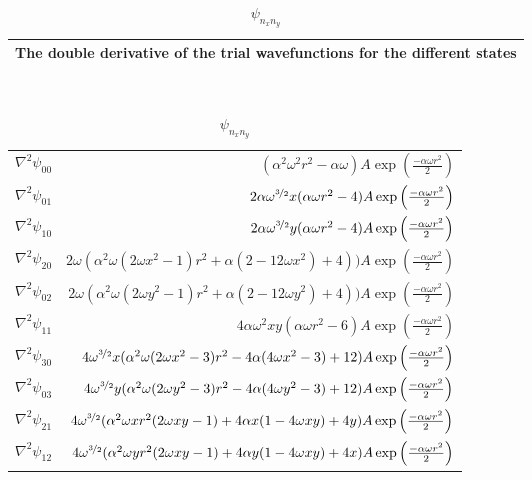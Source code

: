 \begin{table}[H]\caption{$\psi_{n_xn_y}$}\label{tab:doble_derivative_single_particle_trial_wavefunctions}
\begin{tabular}{l}
The double derivative of the trial wavefunctions for the different states\\ \hline
\end{tabular}\\
\begin{tabular}{l|r}
\large $\nabla^2 \psi_{00}$ & \large $ (\alpha^2\omega^2 r^2-\alpha\omega) A\exp\left({\frac{-\alpha\omega r^2}{2}}\right)$\\
\large $\nabla^2 \psi_{01}$ & \large $2\alpha \omega^{\nicefrac{3}{2}} x (\alpha \omega r^2 -4)A\exp\left({\frac{-\alpha\omega r^2}{2}}\right)$\\
\large $\nabla^2 \psi_{10}$ & \large $2\alpha \omega^{\nicefrac{3}{2}} y (\alpha \omega r^2 -4)A\exp\left({\frac{-\alpha\omega r^2}{2}}\right)$\\
\large $\nabla^2 \psi_{20}$ & \large $2\omega(\alpha^2 \omega (2\omega x^2 -1)r^2 + \alpha (2-12 \omega x^2) + 4)) A\exp\left({\frac{-\alpha\omega r^2}{2}}\right)$\\
\large $\nabla^2 \psi_{02}$ & \large $2\omega(\alpha^2 \omega (2\omega y^2 -1)r^2 + \alpha (2-12 \omega y^2) + 4)) A\exp\left({\frac{-\alpha\omega r^2}{2}}\right)$\\
\large $\nabla^2 \psi_{11}$ & \large $4\alpha \omega^2 xy(\alpha \omega r^2 - 6)A\exp\left({\frac{-\alpha\omega r^2}{2}}\right)$\\
\large $\nabla^2 \psi_{30}$ & \large $ 4 \omega^{\nicefrac{3}{2}} x (\alpha^2 \omega (2 \omega x^2 - 3) r^2 - 4 \alpha (4 \omega x^2 - 3) + 12) A\exp\left({\frac{-\alpha\omega r^2}{2}}\right)$\\
\large $\nabla^2 \psi_{03}$ & \large$ 4 \omega^{\nicefrac{3}{2}} y (\alpha^2 \omega (2 \omega y^2 - 3) r^2 - 4 \alpha (4 \omega y^2 - 3) + 12) A\exp\left({\frac{-\alpha\omega r^2}{2}}\right)$\\
\large $\nabla^2 \psi_{21}$ & \large $4 \omega^{\nicefrac{3}{2}} (\alpha^2 \omega x r^2 (2 \omega x y - 1) + 4 \alpha x (1 - 4\omega x y) + 4 y)A\exp\left({\frac{-\alpha\omega r^2}{2}}\right)$\\
\large $\nabla^2 \psi_{12}$ & \large $4 \omega^{\nicefrac{3}{2}} (\alpha^2 \omega y r^2 (2 \omega x y - 1) + 4 \alpha y (1 - 4\omega x y) + 4 x)A\exp\left({\frac{-\alpha\omega r^2}{2}}\right)$\\
\end{tabular}
\end{table}